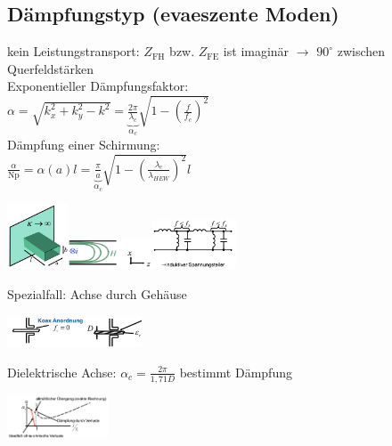 \documentclass[english]{latex4ei/latex4ei_sheet}
\begin{document}
\begin{sectionbox}
	\subsection{Dämpfungstyp (evaeszente Moden)}
	kein Leistungstransport: $Z_{\text{FH}}$ bzw. $Z_{\text{FE}}$ ist imaginär $\rightarrow$ $90^\circ$ zwischen Querfeldstärken\\
	Exponentieller Dämpfungsfaktor:\\
	$\alpha=\sqrt{k_{x}^{2}+k_{y}^{2}-k^{2}}=\underbrace{\frac{2 \pi}{\lambda_{c}}}_{\alpha_{c}} \sqrt{1-\left(\frac{f}{f_{c}}\right)^{2}}$\\
	Dämpfung einer Schirmung:\\ 
	$\frac{\alpha}{\mathrm{Np}}=\alpha(a) l=\underbrace{\frac{\pi}{a}}_{\alpha_c} \sqrt{1-\left(\frac{\lambda_{c}}{\lambda_{H E W}}\right)^{2}} l$\\
	\begin{center}\includegraphics[width = 1.8cm]{./img/hl-schirmung.png}\includegraphics[width = 2.5cm]{./img/hl-schirmung3.png}\includegraphics[width = 2.5cm]{./img/hl-daempfung.png}\end{center}
	Spezialfall: Achse durch Gehäuse\\
	\begin{center}\includegraphics[width = 4cm]{./img/hl-schirmung2.jpeg}\end{center}
	Dielektrische Achse: $\alpha_{c}=\frac{2 \pi}{1,71 D}$ bestimmt Dämpfung\\
	\begin{center}\includegraphics[width = 3cm]{./img/hl-dampfung.png}\end{center}

\end{sectionbox}
\end{document}
